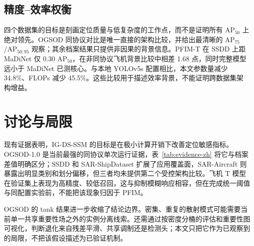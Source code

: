 \documentclass[10pt,twocolumn]{ctexart}
\newcommand{\method}{IG-DS-SSM}
\begin{document}
\subsection{精度--效率权衡}

四个数据集的目标是刻画定位质量与低复杂度的工作点，而不是证明所有 AP$_{50}$ 上绝对领先。OGSOD 同协议对比是唯一直接的架构比较，并给出最清晰的 AP$_{75}$/AP$_{50:95}$ 观察；其余档案结果只提供非因果的背景信息。PFIM-T 在 SSDD 上距 MaDiNet 仅 0.30 AP$_{50}$，在非同协议飞机背景比较中相差 1.68 点，同时完整模型远小于 MaDiNet 已测核心。与本地 YOLOv5s 配置相比，本文参数量减少 34.8\%、FLOPs 减少 45.5\%。这些比较用于描述效率背景，不能证明跨数据集架构增益。

\begin{table}[t]
\centering
\scriptsize
\setlength{\tabcolsep}{2.4pt}
\caption{T 级 PFIM 相对 baseline 的证据层级。正值表示 PFIM 提升，单位为百分点。}
\label{tab:evidence-zh}
\end{table}

\FloatBarrier
\section{讨论与局限}

现有证据表明，\method{} 的目标是在极小计算开销下改善定位敏感指标。OGSOD-1.0 是当前最强的同协议单次运行证据，表~\ref{tab:evidence-zh} 将它与档案差值明确区分；SSDD 和 SAR-ShipDataset 扩展了应用覆盖面，SAR-Aircraft 则暴露出明显类别和划分偏移，但三者均未提供第二个受控架构比较。飞机 T 模型在验证集上表现为高精度、较低召回，这与抑制模糊响应相容，但在完成统一阈值与同配置实验前，不能把该现象归因于 PFIM。

OGSOD 的 tank 结果进一步收缩了结论边界。密集、重复的散射模式可能需要当前单一共享重要性场之外的实例分离线索。还需通过按密度分桶的评估和重要性图可视化，判断退化来自残差平滑、共享调制还是检测头；本文只把它作为已观察到的局限，不把该假设描述为已验证机制。
\end{document}
